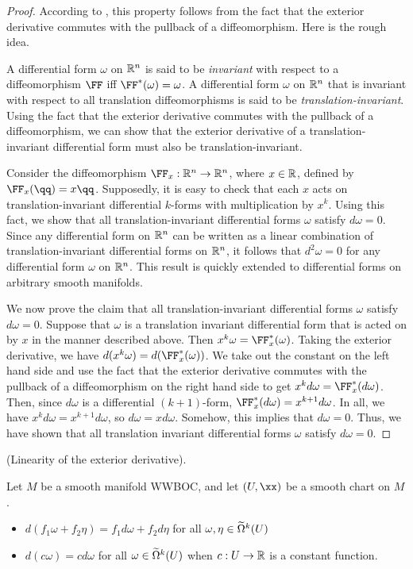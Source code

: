 \begin{proof}
    According to \cite{StackExchangePullbackImpliesdd0}, this property follows from the fact that the exterior derivative commutes with the pullback of a diffeomorphism. Here is the rough idea.
    
    A differential form $\omega$ on $\mathbb{R}^n$ is said to be \textit{invariant} with respect to a diffeomorphism $\FF$ iff $\FF^*(\omega) = \omega$. A differential form $\omega$ on $\mathbb{R}^n$ that is invariant with respect to all translation diffeomorphisms is said to be \textit{translation-invariant}. Using the fact that the exterior derivative commutes with the pullback of a diffeomorphism, we can show that the exterior derivative of a translation-invariant differential form must also be translation-invariant.
    
    Consider the diffeomorphism $\FF_x:\R^n \rightarrow \R^n$, where $x \in \mathbb{R}$, defined by $\FF_x(\qq) = x\qq$. Supposedly, it is easy to check that each $x$ acts on translation-invariant differential $k$-forms with multiplication by $x^k$. Using this fact, we show that all translation-invariant differential forms $\omega$ satisfy $d \omega = 0$. Since any differential form on $\mathbb{R}^n$ can be written as a linear combination of translation-invariant differential forms on $\mathbb{R}^n$, it follows that $d^2 \omega = 0$ for any differential form $\omega$ on $\mathbb{R}^n$. This result is quickly extended to differential forms on arbitrary smooth manifolds.
    
    We now prove the claim that all translation-invariant differential forms $\omega$ satisfy $d \omega = 0$. Suppose that $\omega$ is a translation invariant differential form that is acted on by $x$ in the manner described above. Then $x^k \omega = \FF_x^*(\omega)$. Taking the exterior derivative, we have $d(x^k \omega) = d(\FF_x^*(\omega))$. We take out the constant on the left hand side and use the fact that the exterior derivative commutes with the pullback of a diffeomorphism on the right hand side to get $x^k d\omega = \FF_x^*(d\omega)$. Then, since $d\omega$ is a differential $(k + 1)$-form, $\FF_x^*(d\omega) = x^{k + 1} d\omega$. In all, we have $x^k d\omega = x^{k + 1} d \omega$, so $d\omega = xd\omega$. Somehow, this implies that $d \omega = 0$. Thus, we have shown that all translation invariant differential forms $\omega$ satisfy $d \omega = 0$. 
\end{proof}

\newpage

\begin{theorem}
     (Linearity of the exterior derivative).
    
    Let $M$ be a smooth manifold WWBOC, and let $(U, \xx)$ be a smooth chart on $M$.
    
    \begin{itemize}
        \item $d(f_1 \omega + f_2 \eta) = f_1 d \omega + f_2 d \eta$ for all $\omega, \eta \in \widetilde{\Omega}^k(U)$
        \item $d(c \omega) = cd\omega$ for all $\omega \in \widetilde{\Omega}^k(U)$ when $c:U \rightarrow \mathbb{R}$ is a constant function.
    \end{itemize}
\end{theorem}

